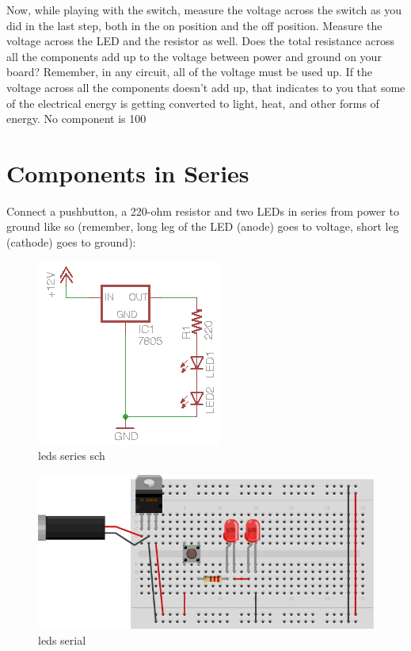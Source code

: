 Now, while playing with the switch, measure the voltage across the switch as you did in the last step, both in the on position and the off position. Measure the voltage across the LED and the resistor as well. Does the total resistance across all the components add up to the voltage between power and ground on your board? Remember, in any circuit, all of the voltage must be used up. If the voltage across all the components doesn't add up, that indicates to you that some of the electrical energy is getting converted to light, heat, and other forms of energy. No component is 100%

\section{Components in Series}

Connect a pushbutton, a 220-ohm resistor and two LEDs in series from power to ground like so (remember, long leg of the LED (anode) goes to voltage, short leg (cathode) goes to ground):

\begin{figure}[!htb]
 \centering
 \includegraphics[scale=0.8]{img/electronics/leds_series_sch.png}
 \caption{leds series sch}
 \label{leds series sch}
\end{figure}

\begin{figure}[!htb]
 \centering
 \includegraphics[scale=0.8]{img/electronics/leds_serial.png}
 \caption{leds serial}
 \label{leds serial}
\end{figure}

